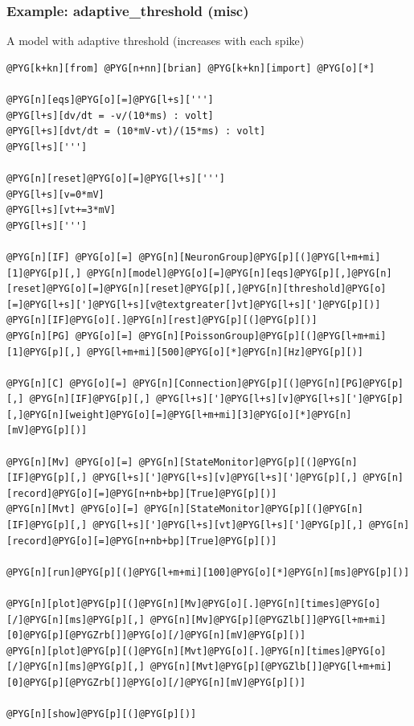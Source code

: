 \documentclass[letterpaper,10pt,english]{manual}
\begin{document}
\resetcurrentobjects
\hypertarget{--doc-examples-misc_adaptive_threshold}{}

\hypertarget{index-39}{}\subsubsection{Example: adaptive\_threshold (misc)}

A model with adaptive threshold (increases with each spike)

\begin{Verbatim}[commandchars=@\[\]]
@PYG[k+kn][from] @PYG[n+nn][brian] @PYG[k+kn][import] @PYG[o][*]

@PYG[n][eqs]@PYG[o][=]@PYG[l+s][''']
@PYG[l+s][dv/dt = -v/(10*ms) : volt]
@PYG[l+s][dvt/dt = (10*mV-vt)/(15*ms) : volt]
@PYG[l+s][''']

@PYG[n][reset]@PYG[o][=]@PYG[l+s][''']
@PYG[l+s][v=0*mV]
@PYG[l+s][vt+=3*mV]
@PYG[l+s][''']

@PYG[n][IF] @PYG[o][=] @PYG[n][NeuronGroup]@PYG[p][(]@PYG[l+m+mi][1]@PYG[p][,] @PYG[n][model]@PYG[o][=]@PYG[n][eqs]@PYG[p][,]@PYG[n][reset]@PYG[o][=]@PYG[n][reset]@PYG[p][,]@PYG[n][threshold]@PYG[o][=]@PYG[l+s][']@PYG[l+s][v@textgreater[]vt]@PYG[l+s][']@PYG[p][)]
@PYG[n][IF]@PYG[o][.]@PYG[n][rest]@PYG[p][(]@PYG[p][)]
@PYG[n][PG] @PYG[o][=] @PYG[n][PoissonGroup]@PYG[p][(]@PYG[l+m+mi][1]@PYG[p][,] @PYG[l+m+mi][500]@PYG[o][*]@PYG[n][Hz]@PYG[p][)]

@PYG[n][C] @PYG[o][=] @PYG[n][Connection]@PYG[p][(]@PYG[n][PG]@PYG[p][,] @PYG[n][IF]@PYG[p][,] @PYG[l+s][']@PYG[l+s][v]@PYG[l+s][']@PYG[p][,]@PYG[n][weight]@PYG[o][=]@PYG[l+m+mi][3]@PYG[o][*]@PYG[n][mV]@PYG[p][)]

@PYG[n][Mv] @PYG[o][=] @PYG[n][StateMonitor]@PYG[p][(]@PYG[n][IF]@PYG[p][,] @PYG[l+s][']@PYG[l+s][v]@PYG[l+s][']@PYG[p][,] @PYG[n][record]@PYG[o][=]@PYG[n+nb+bp][True]@PYG[p][)]
@PYG[n][Mvt] @PYG[o][=] @PYG[n][StateMonitor]@PYG[p][(]@PYG[n][IF]@PYG[p][,] @PYG[l+s][']@PYG[l+s][vt]@PYG[l+s][']@PYG[p][,] @PYG[n][record]@PYG[o][=]@PYG[n+nb+bp][True]@PYG[p][)]

@PYG[n][run]@PYG[p][(]@PYG[l+m+mi][100]@PYG[o][*]@PYG[n][ms]@PYG[p][)]

@PYG[n][plot]@PYG[p][(]@PYG[n][Mv]@PYG[o][.]@PYG[n][times]@PYG[o][/]@PYG[n][ms]@PYG[p][,] @PYG[n][Mv]@PYG[p][@PYGZlb[]]@PYG[l+m+mi][0]@PYG[p][@PYGZrb[]]@PYG[o][/]@PYG[n][mV]@PYG[p][)]
@PYG[n][plot]@PYG[p][(]@PYG[n][Mvt]@PYG[o][.]@PYG[n][times]@PYG[o][/]@PYG[n][ms]@PYG[p][,] @PYG[n][Mvt]@PYG[p][@PYGZlb[]]@PYG[l+m+mi][0]@PYG[p][@PYGZrb[]]@PYG[o][/]@PYG[n][mV]@PYG[p][)]

@PYG[n][show]@PYG[p][(]@PYG[p][)]
\end{Verbatim}
\end{document}
